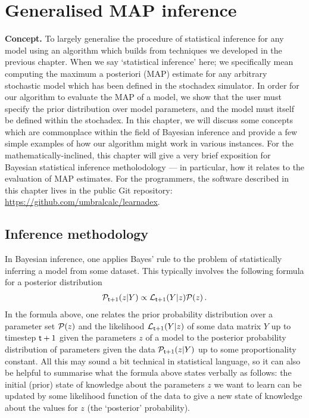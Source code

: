 \chapter{\sffamily Generalised MAP inference}

{\bfseries\sffamily Concept.} To largely generalise the procedure of statistical inference for any model using an algorithm which builds from techniques we developed in the previous chapter. When we say `statistical inference' here; we specifically mean computing the maximum a posteriori (MAP) estimate for any arbitrary stochastic model which has been defined in the stochadex simulator. In order for our algorithm to evaluate the MAP of a model, we show that the user must specify the prior distribution over model parameters, and the model must itself be defined within the stochadex. In this chapter, we will discuss some concepts which are commonplace within the field of Bayesian inference and provide a few simple examples of how our algorithm might work in various instances. For the mathematically-inclined, this chapter will give a very brief exposition for Bayesian statistical inference metholodology --- in particular, how it relates to the evaluation of MAP estimates. For the programmers, the software described in this chapter lives in the public Git repository: \href{https://github.com/umbralcalc/learnadex}{https://github.com/umbralcalc/learnadex}.


\section{\sffamily Inference methodology}

In Bayesian inference, one applies Bayes' rule to the problem of statistically inferring a model from some dataset. This typically involves the following formula for a posterior distribution
\begin{align}
{\cal P}_{{\sf t}+1}(z \vert Y) \propto {\cal L}_{{\sf t}+1}(Y\vert z){\cal P} (z) \label{eq:bayes-rule} \,.
\end{align}
In the formula above, one relates the prior probability distribution over a parameter set ${\cal P} (z)$ and the likelihood ${\cal L}_{{\sf t}+1}(Y\vert z)$  of some data matrix $Y$ up to timestep ${\sf t}+1$ given the parameters $z$ of a model to the posterior probability distribution of parameters given the data ${\cal P}_{{\sf t}+1}(z \vert Y)$ up to some proportionality constant. All this may sound a bit technical in statistical language, so it can also be helpful to summarise what the formula above states verbally as follows: the initial (prior) state of knowledge about the parameters $z$ we want to learn can be updated by some likelihood function of the data to give a new state of knowledge about the values for $z$ (the `posterior' probability). 

